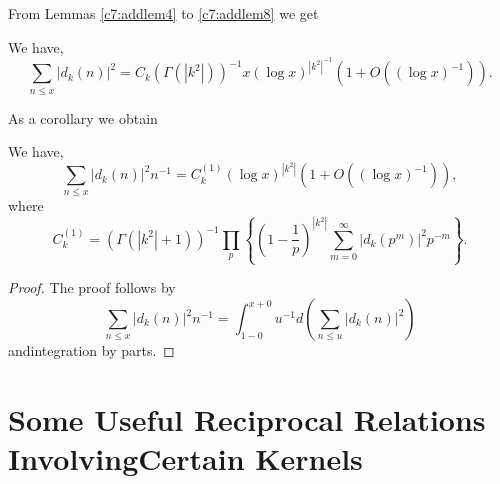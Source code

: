 From Lemmas \ref{c7:addlem4} to \ref{c7:addlem8} we get

\begin{theorem}\label{c7:thm7.6.1}
We have,
$$
\sum_{n\leq x}|d_{k}(n)|^{2}=C_{k}(\Gamma(|k^{2}|))^{-1}x(\log
x)^{|k^{2}|^{-1}}(1+O((\log x)^{-1})).
$$
\end{theorem}

As a corollary we obtain
\begin{theorem}\label{c7:thm7.6.2}
We have,
$$
\sum_{n\leq x}|d_{k}(n)|^{2}n^{-1}=C^{(1)}_{k}(\log
x)^{|k^{2}|}(1+O((\log x)^{-1})),
$$
where
$$
C^{(1)}_{k}=(\Gamma(|k^{2}|+1))^{-1}\prod_{p}\left\{\left(1-\frac{1}{p}\right)^{|k^{2}|}\sum^{\infty}_{m=0}|d_{k}(p^{m})|^{2}p^{-m}\right\}.
$$
\end{theorem}

\begin{proof}
The proof follows by
$$
\sum_{n\leq
  x}|d_{k}(n)|^{2}n^{-1}=\int^{x+0}_{1-0}u^{-1}d\left(\sum_{n\leq
  u}|d_{k}(n)|^{2}\right) 
$$
and\pageoriginale integration by parts.
\end{proof}

\section[Some Useful Reciprocal Relations Involving...]{Some Useful
  Reciprocal Relations Involving\hfil\break Certain 
  Kernels}\label{c7:sec7.7}

